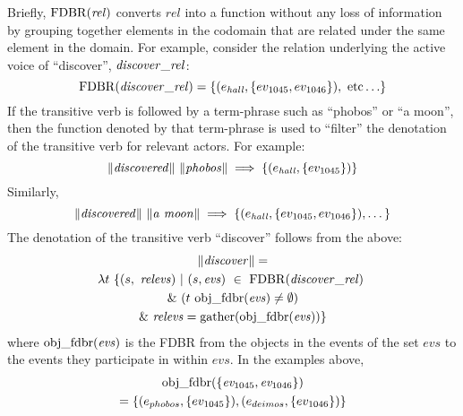 \documentclass[../main.tex]{subfiles}
\begin{document}
\begin{refsection}
Briefly, $\mathrm{FDBR}({\mathit{rel}})$ converts $\mathit{rel}$ into a function without any loss of information by grouping together elements in the codomain that are related under the same element in the domain. For example, consider the relation underlying the active voice of ``discover'', $\mathit{discover\_rel}$:
\[ \FDBR{\relation{discover}} = \{(\entityassoc{\hall}, \{ \eventassoc{1045}, \eventassoc{1046} \} ),\ \mathrm{etc} \ldots \} \]
If the transitive verb is followed by a term-phrase such as ``phobos'' or ``a moon'', then
the function denoted by that term-phrase is used to ``filter'' the denotation of the transitive verb for relevant actors. For example:
\[ \lVert \mathit{discovered} \rVert \ \lVert \mathit{phobos} \rVert \implies \{ (e_{\mathit{hall}}, \{ ev_{\mathrm{1045}} \} ) \} \]
Similarly,
\[\meaningof{discovered} \ \meaningof{a\ moon} \implies \{ (\entityassoc{\hall}, \{ \eventassoc{1045}, \eventassoc{1046} \} ), \dots \} \]
\noindent The denotation of the transitive verb ``discover'' follows from the above:
\begin{multline*}
	\meaningof{discover} = \\
	\lambda t\ \{ (s,\ \mathit{relevs})\ |\ (s, \mathit{evs})\ \in\ \FDBR{\relation{discover}}\  \\
	\&\ (t\ \objfdbr{evs} \neq \emptyset) \\
	\&\ \mathit{relevs} = \gatherevs{\objfdbr{evs}} \}
\end{multline*}
where $\mathrm{obj\_fdbr}(\mathit{evs})$ is the FDBR from the objects in the events of the set $\mathit{evs}$ to the events they participate in within $\mathit{evs}$.  In the examples above,
\begin{multline*}
	\mathrm{obj\_fdbr}(\mathit{\{ev_{\mathrm{1045}}, ev_{\mathrm{1046}}\}}) \\ = \{(e_{phobos}, \{ev_{\mathrm{1045}}\}), (e_{deimos}, \{ev_{\mathrm{1046}}\}) \}
\end{multline*}


\end{refsection}
\end{document}
